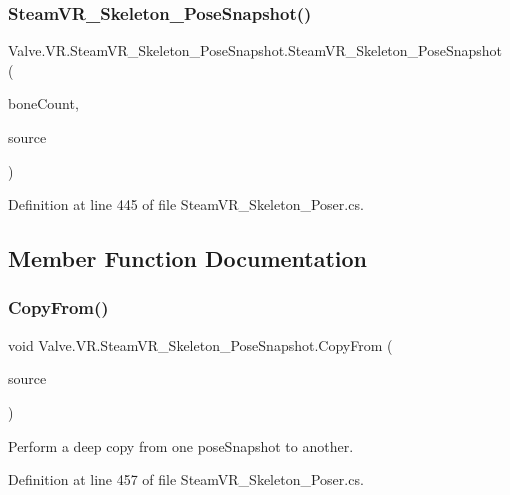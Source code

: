 \subsubsection{\texorpdfstring{SteamVR\_Skeleton\_PoseSnapshot()}{SteamVR\_Skeleton\_PoseSnapshot()}}
{\footnotesize\ttfamily Valve.\+V\+R.\+Steam\+V\+R\+\_\+\+Skeleton\+\_\+\+Pose\+Snapshot.\+Steam\+V\+R\+\_\+\+Skeleton\+\_\+\+Pose\+Snapshot (\begin{DoxyParamCaption}\item[{int}]{bone\+Count,  }\item[{\mbox{\hyperlink{namespace_valve_1_1_v_r_a82e5bf501cc3aa155444ee3f0662853f}{Steam\+V\+R\+\_\+\+Input\+\_\+\+Sources}}}]{source }\end{DoxyParamCaption})}



Definition at line 445 of file Steam\+V\+R\+\_\+\+Skeleton\+\_\+\+Poser.\+cs.



\subsection{Member Function Documentation}
\mbox{\label{class_valve_1_1_v_r_1_1_steam_v_r___skeleton___pose_snapshot_a96ae7177ed7545d473ad0e14e03afe01}} 
\subsubsection{\texorpdfstring{CopyFrom()}{CopyFrom()}}
{\footnotesize\ttfamily void Valve.\+V\+R.\+Steam\+V\+R\+\_\+\+Skeleton\+\_\+\+Pose\+Snapshot.\+Copy\+From (\begin{DoxyParamCaption}\item[{\mbox{\hyperlink{class_valve_1_1_v_r_1_1_steam_v_r___skeleton___pose_snapshot}{Steam\+V\+R\+\_\+\+Skeleton\+\_\+\+Pose\+Snapshot}}}]{source }\end{DoxyParamCaption})}



Perform a deep copy from one pose\+Snapshot to another. 



Definition at line 457 of file Steam\+V\+R\+\_\+\+Skeleton\+\_\+\+Poser.\+cs.



